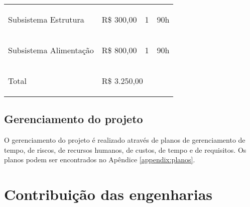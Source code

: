 \begin{table}[h]
{\begin{tabular}{ l l l l }
  \cline{1-1}\cline{2-2}\cline{3-3}\cline{4-4}  
    \multicolumn{1}{p{2.367cm}|}{\begin{center}Subsistema Estrutura
\end{center}} &
    \multicolumn{1}{p{2.367cm}|}{\begin{center}R\$ 300,00
\end{center}} &
    \multicolumn{1}{p{2.367cm}|}{\begin{center}1
\end{center}} &
    \multicolumn{1}{p{2.367cm}}{\begin{center}90h
\end{center}}
  \\  
  \cline{1-1}\cline{2-2}\cline{3-3}\cline{4-4}  
    \multicolumn{1}{p{2.367cm}|}{\begin{center}Subsistema Alimentação
\end{center}} &
    \multicolumn{1}{p{2.367cm}|}{\begin{center}R\$ 800,00
\end{center}} &
    \multicolumn{1}{p{2.367cm}|}{\begin{center}1
\end{center}} &
    \multicolumn{1}{p{2.367cm}}{\begin{center}90h
\end{center}}
  \\  
  \cline{1-1}\cline{2-2}\cline{3-3}\cline{4-4}  
    \multicolumn{1}{p{2.367cm}}{\begin{center}Total
\end{center}} &
    \multicolumn{3}{p{7.100cm}}{\begin{center}R\$ 3.250,00
\end{center}}
  \\  
  \hline

 \end{tabular} }
\end{table}


\subsection{Gerenciamento do projeto}

O gerenciamento do projeto é realizado através de planos de gerenciamento de tempo, de riscos, de recursos humanos, de custos, de tempo e de requisitos. Os planos podem ser encontrados no Apêndice \ref{appendix:planos}.


\section{Contribuição das engenharias}

